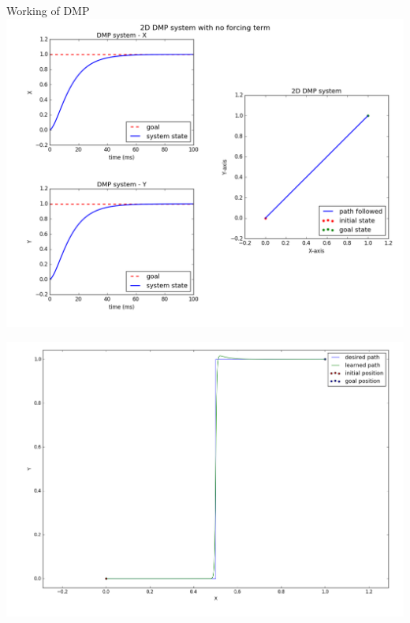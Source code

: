\documentclass{beamer}
\begin{document}
	\begin{frame}{Working of DMP}
		\includegraphics[width=\textwidth]{images/dmp_no_f}
	\end{frame}
	\begin{frame}
		\includegraphics[width=\textwidth]{images/step_f}
	\end{frame}
\end{document}
